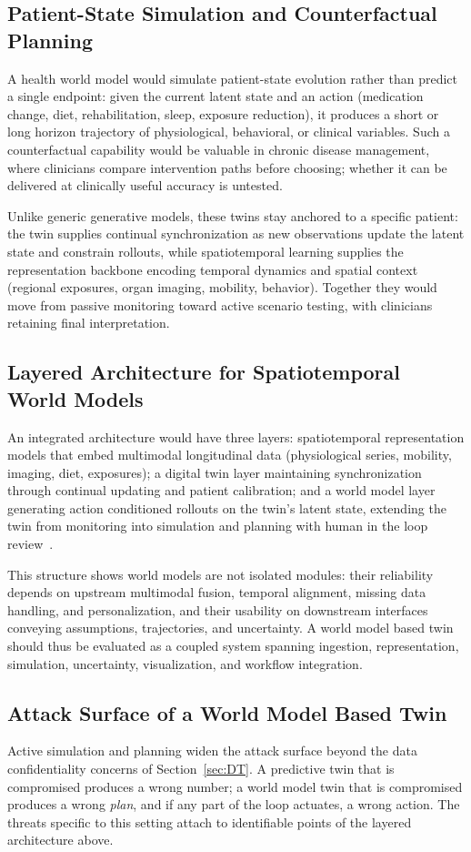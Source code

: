 \documentclass[journal]{IEEEtran}
\begin{document}
\subsection{Patient-State Simulation and Counterfactual Planning}
A health world model would simulate patient-state evolution rather than predict a single endpoint: given the current latent state and an action (medication change, diet, rehabilitation, sleep, exposure reduction), it produces a short or long horizon trajectory of physiological, behavioral, or clinical variables. Such a counterfactual capability would be valuable in chronic disease management, where clinicians compare intervention paths before choosing; whether it can be delivered at clinically useful accuracy is untested.

Unlike generic generative models, these twins stay anchored to a specific patient: the twin supplies continual synchronization as new observations update the latent state and constrain rollouts, while spatiotemporal learning supplies the representation backbone encoding temporal dynamics and spatial context (regional exposures, organ imaging, mobility, behavior). Together they would move from passive monitoring toward active scenario testing, with clinicians retaining final interpretation.

\subsection{Layered Architecture for Spatiotemporal World Models}
An integrated architecture would have three layers: spatiotemporal representation models that embed multimodal longitudinal data (physiological series, mobility, imaging, diet, exposures); a digital twin layer maintaining synchronization through continual updating and patient calibration; and a world model layer generating action conditioned rollouts on the twin's latent state, extending the twin from monitoring into simulation and planning with human in the loop review~\cite{Sadee2025MedicalDT}.

This structure shows world models are not isolated modules: their reliability depends on upstream multimodal fusion, temporal alignment, missing data handling, and personalization, and their usability on downstream interfaces conveying assumptions, trajectories, and uncertainty. A world model based twin should thus be evaluated as a coupled system spanning ingestion, representation, simulation, uncertainty, visualization, and workflow integration.

\subsection{Attack Surface of a World Model Based Twin}
Active simulation and planning widen the attack surface beyond the data confidentiality concerns of Section~\ref{sec:DT}. A predictive twin that is compromised produces a wrong number; a world model twin that is compromised produces a wrong \emph{plan}, and if any part of the loop actuates, a wrong action. The threats specific to this setting attach to identifiable points of the layered architecture above.
\end{document}
